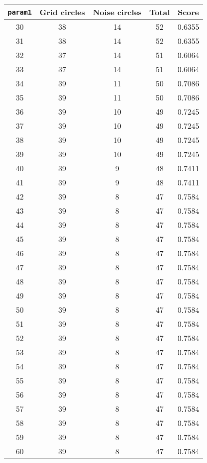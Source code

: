 \documentclass[letterpaper, 12pt]{article}
\begin{document}
\begin{longtable}{|c|c|c|c|c|}
\hline
\textbf{\texttt{param1}} & \textbf{Grid circles} & \textbf{Noise circles} & \textbf{Total} & \textbf{Score} \\
\hline
30 & 38 & 14 & 52 & 0.6355 \\
\hline
31 & 38 & 14 & 52 & 0.6355 \\
\hline
32 & 37 & 14 & 51 & 0.6064 \\
\hline
33 & 37 & 14 & 51 & 0.6064 \\
\hline
34 & 39 & 11 & 50 & 0.7086 \\
\hline
35 & 39 & 11 & 50 & 0.7086 \\
\hline
36 & 39 & 10 & 49 & 0.7245 \\
\hline
37 & 39 & 10 & 49 & 0.7245 \\
\hline
38 & 39 & 10 & 49 & 0.7245 \\
\hline
39 & 39 & 10 & 49 & 0.7245 \\
\hline
40 & 39 & 9 & 48 & 0.7411 \\
\hline
41 & 39 & 9 & 48 & 0.7411 \\
\hline
42 & 39 & 8 & 47 & 0.7584 \\
\hline
43 & 39 & 8 & 47 & 0.7584 \\
\hline
44 & 39 & 8 & 47 & 0.7584 \\
\hline
45 & 39 & 8 & 47 & 0.7584 \\
\hline
46 & 39 & 8 & 47 & 0.7584 \\
\hline
47 & 39 & 8 & 47 & 0.7584 \\
\hline
48 & 39 & 8 & 47 & 0.7584 \\
\hline
49 & 39 & 8 & 47 & 0.7584 \\
\hline
50 & 39 & 8 & 47 & 0.7584 \\
\hline
51 & 39 & 8 & 47 & 0.7584 \\
\hline
52 & 39 & 8 & 47 & 0.7584 \\
\hline
53 & 39 & 8 & 47 & 0.7584 \\
\hline
54 & 39 & 8 & 47 & 0.7584 \\
\hline
55 & 39 & 8 & 47 & 0.7584 \\
\hline
56 & 39 & 8 & 47 & 0.7584 \\
\hline
57 & 39 & 8 & 47 & 0.7584 \\
\hline
58 & 39 & 8 & 47 & 0.7584 \\
\hline
59 & 39 & 8 & 47 & 0.7584 \\
\hline
60 & 39 & 8 & 47 & 0.7584 \\
\hline

\end{longtable}
\end{document}
